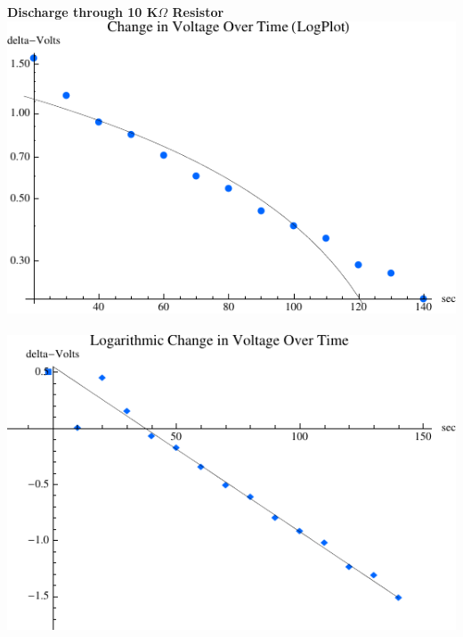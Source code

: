 \documentclass{article}
\begin{document}
\begin{samepage}
\nopagebreak
\textbf{Discharge through 10 K$\Omega$ Resistor} \hfill \\
\nopagebreak
\includegraphics{lab5_graph3}\\ \\
\includegraphics{lab5_graph4}\\
\end{samepage}
\end{document}
